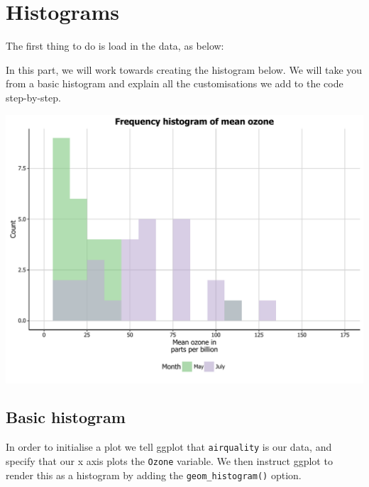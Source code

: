\chapter{Histograms}\label{histograms}

The first thing to do is load in the data, as below:

\begin{Shaded}
\begin{Highlighting}[]
\NormalTok{(} \NormalTok{())}

\end{Highlighting}
\end{Shaded}

In this part, we will work towards creating the histogram below. We will
take you from a basic histogram and explain all the customisations we
add to the code step-by-step.

\begin{center}\includegraphics[width=0.55\linewidth]{figures/histogram_final-1} \end{center}

\section{Basic histogram}\label{basic-histogram}

In order to initialise a plot we tell ggplot that \texttt{airquality} is
our data, and specify that our x axis plots the \texttt{Ozone} variable.
We then instruct ggplot to render this as a histogram by adding the
\texttt{geom\_histogram()} option.

\begin{Shaded}
\begin{Highlighting}[]
\StringTok{ }\NormalTok{(} \StringTok{ }\NormalTok{()}
\end{Highlighting}
\end{Shaded}

